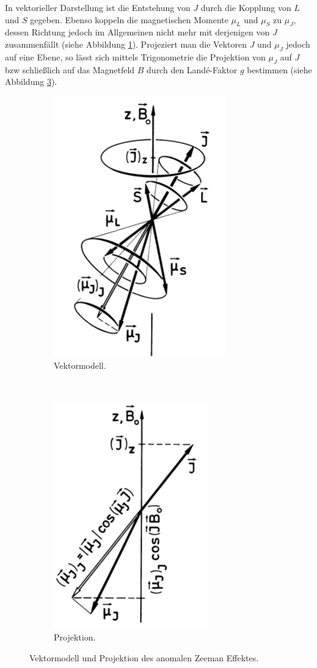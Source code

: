 	In vektorieller Darstellung ist die Entstehung von $J$ durch die Kopplung von $L$ und $S$ gegeben. Ebenso koppeln die magnetischen Momente $\mu_L$ und $\mu_S$ zu $\mu_J$, dessen Richtung jedoch im Allgemeinen nicht mehr mit derjenigen von $J$ zusammenfällt (siehe Abbildung \ref{fig:VektormodellAnomalZeeman}). Projeziert man die Vektoren $J$ und $\mu_J$ jedoch auf eine Ebene, so lässt sich mittels Trigonometrie die Projektion von $\mu_J$ auf $J$ bzw schließlich auf das Magnetfeld $B$ durch den Landé-Faktor $g$ bestimmen (siehe Abbildung \ref{fig:ProjektionVektormodellAnomalerZeeman}).
	\begin{figure}
		\centering
		\begin{subfigure}[b]{0.4\textwidth}
			\centering
			\includegraphics{Bilddateien/Grundlagen/VektormodellAnomalZeeman.png}
			\caption{Vektormodell.}
			\label{fig:VektormodellAnomalZeeman}
		\end{subfigure}
		\
		\begin{subfigure}[b]{0.4\textwidth}
			\centering
			\includegraphics{Bilddateien/Grundlagen/ProjektionVektormodellAnomalerZeeman.png}
			\caption{Projektion.}
			\label{fig:ProjektionVektormodellAnomalerZeeman}
		\end{subfigure}
		\caption{Vektormodell und Projektion des anomalen Zeeman Effektes.}
	\end{figure}

